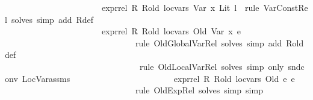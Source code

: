 \begin{isabellebody}
\ \ \ \ \ \ \ \ \ \ \ \ \ \ \ \ \ \ \ \ \ \ \ {\isachardoublequoteopen}expr{\isacharunderscore}{\kern0pt}rel\ {\isacharquery}{\kern0pt}R\ {\isacharquery}{\kern0pt}R{\isacharunderscore}{\kern0pt}old\ {\isacharquery}{\kern0pt}loc{\isacharunderscore}{\kern0pt}vars\ {\isacharparenleft}{\kern0pt}Var\ {\isacharquery}{\kern0pt}x{}{\isacharparenright}{\kern0pt}\ {\isacharparenleft}{\kern0pt}Lit\ {\isacharquery}{\kern0pt}l{\isacharparenright}{\kern0pt}{\isachardoublequoteclose}\ {\isasymRightarrow}\ {\isacartoucheopen}rule\ Var{\isacharunderscore}{\kern0pt}Const{\isacharunderscore}{\kern0pt}Rel{\isacharcomma}{\kern0pt}\ solves\ {\isasymopen}simp\ add{\isacharcolon}{\kern0pt}\ R{\isacharunderscore}{\kern0pt}def{\isasymclose}{\isacartoucheclose}\ \ {\isasymbar}\isanewline
\ \ \ \ \ \ \ \ \ \ \ \ \ \ \ \ \ \ \ \ \ \ \ {\isachardoublequoteopen}expr{\isacharunderscore}{\kern0pt}rel\ {\isacharquery}{\kern0pt}R\ {\isacharquery}{\kern0pt}R{\isacharunderscore}{\kern0pt}old\ {\isacharquery}{\kern0pt}loc{\isacharunderscore}{\kern0pt}vars\ {\isacharparenleft}{\kern0pt}Old\ {\isacharparenleft}{\kern0pt}Var\ {\isacharquery}{\kern0pt}x{}{\isacharparenright}{\kern0pt}{\isacharparenright}{\kern0pt}\ {\isacharquery}{\kern0pt}e{}{\isachardoublequoteclose}\ {\isasymRightarrow}\ \isanewline
\ \ \ \ \ \ \ \ \ \ \ \ \ \ \ \ \ \ \ \ \ \ \ \ \ \ \ \ \ \ \ {\isacartoucheopen}rule\ OldGlobalVar{\isacharunderscore}{\kern0pt}Rel{\isacharcomma}{\kern0pt}\ solves\ {\isasymopen}simp\ add{\isacharcolon}{\kern0pt}\ R{\isacharunderscore}{\kern0pt}old{\isacharunderscore}{\kern0pt}def{\isasymclose}\ \ {\isacharbar}{\kern0pt}\isanewline
\ \ \ \ \ \ \ \ \ \ \ \ \ \ \ \ \ \ \ \ \ \ \ \ \ \ \ \ \ \ \ \ rule\ OldLocalVar{\isacharunderscore}{\kern0pt}Rel{\isacharcomma}{\kern0pt}\ solves\ {\isasymopen}simp\ only{\isacharcolon}{\kern0pt}\ snd{\isacharunderscore}{\kern0pt}conv\ LocVar{\isacharunderscore}{\kern0pt}assms{\isasymclose}{\isacartoucheclose}\ {\isasymbar}\isanewline
\ \ \ \ \ \ \ \ \ \ \ \ \ \ \ \ \ \ \ \ \ \ \ {\isachardoublequoteopen}expr{\isacharunderscore}{\kern0pt}rel\ {\isacharquery}{\kern0pt}R\ {\isacharquery}{\kern0pt}R{\isacharunderscore}{\kern0pt}old\ {\isacharquery}{\kern0pt}loc{\isacharunderscore}{\kern0pt}vars\ {\isacharparenleft}{\kern0pt}Old\ {\isacharquery}{\kern0pt}e{}{\isacharparenright}{\kern0pt}\ {\isacharquery}{\kern0pt}e{}{\isachardoublequoteclose}\ {\isasymRightarrow}\isanewline
\ \ \ \ \ \ \ \ \ \ \ \ \ \ \ \ \ \ \ \ \ \ \ \ \ \ \ \ \ \ \ {\isacartoucheopen}rule\ OldExp{\isacharunderscore}{\kern0pt}Rel{\isacharcomma}{\kern0pt}\ solves\ {\isasymopen}simp{\isasymclose}{\isacharcomma}{\kern0pt}\ simp{\isacartoucheclose}\ {\isasymbar}\isanewline

\end{isabellebody}
